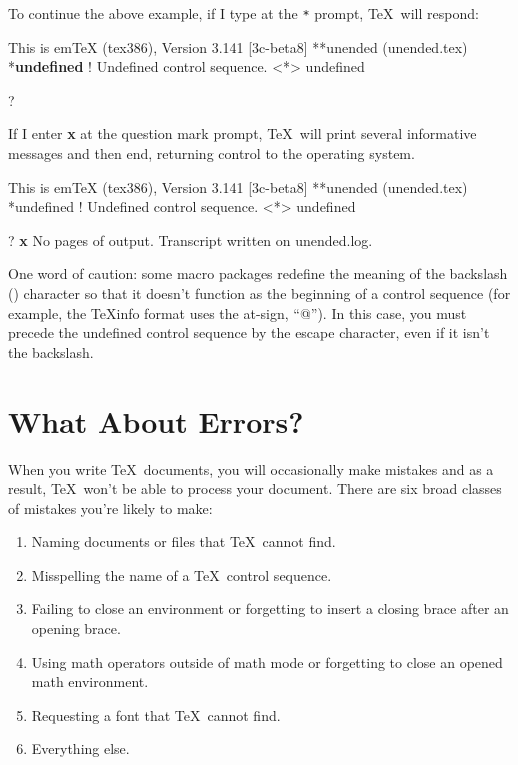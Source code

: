 To continue the above example, if I type  at
the \verb|*| prompt, \TeX\ will respond:

\begin{ttindent}
This is emTeX (tex386), Version 3.141 [3c-beta8]
**unended
(unended.tex)
*\textbf{{\bs}undefined}
! Undefined control sequence.
<*> {\bs}undefined

?
\end{ttindent}

If I enter \textbf{x} at the question mark prompt, \TeX\ will print
several informative messages and then end, returning control to the
operating system.

\begin{ttindent}
This is emTeX (tex386), Version 3.141 [3c-beta8]
**unended
(unended.tex)
*{\bs}undefined
! Undefined control sequence.
<*> {\bs}undefined

? \textbf{x}
No pages of output.
Transcript written on unended.log.
\end{ttindent}

One word of caution: some macro packages redefine the meaning of the
backslash (\bs) character so that it doesn't 
function as the
beginning of a control sequence (for example, the \TeX{}info format
uses the at-sign, ``@'').  In this case, you must precede the
undefined control sequence by the escape character, even if it
isn't the backslash.

\section{What About Errors?}
\label{sec:errors}

When you write \TeX\ documents, you will occasionally make 
mistakes and 
as a result, \TeX\ won't be able to process your document.
There are six broad classes of mistakes you're likely to make:

\begin{enumerate}
  \item Naming documents or files that \TeX\ cannot find.
  \item Misspelling the name of a \TeX\ control sequence.
  \item Failing to close an environment or forgetting to insert a
        closing brace after an opening brace.
  \item Using math operators outside of math mode or forgetting to close
        an opened math environment.
  \item Requesting a font that \TeX\ cannot find.
  \item Everything else.
\end{enumerate}

